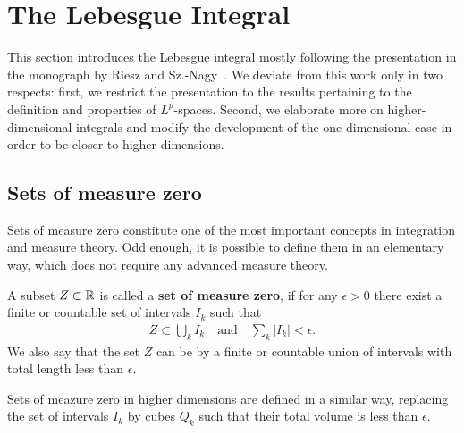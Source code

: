 
\section{The Lebesgue Integral}
\label{sec:lebesgue-integral}
\begin{intro}
  This section introduces the Lebesgue integral mostly following the
  presentation in the monograph by Riesz and
  Sz.-Nagy~\cite{RieszNagy}. We deviate from this work only in two
  respects: first, we restrict the presentation to the results
  pertaining to the definition and properties of $L^p$-spaces. Second,
  we elaborate more on higher-dimensional integrals and modify the
  development of the one-dimensional case in order to be closer to
  higher dimensions.
\end{intro}

\subsection{Sets of measure zero}

\begin{intro}
  Sets of measure zero constitute one of the most important concepts
  in integration and measure theory. Odd enough, it is possible to
  define them in an elementary way, which does not require any
  advanced measure theory.
\end{intro}

\begin{definition}
  \label{def:zero-set-1}
  A subset $Z\subset \mathbb R$ is called a \textbf{set of measure zero}, if
  for any $\epsilon > 0$ there exist a finite or countable set of
  intervals $I_{k}$ such that
  \begin{gather*}
    Z \subset \bigcup_k I_{k}
    \quad\text{and}\quad
    \sum_k |I_{k}| < \epsilon.
  \end{gather*}
  We also say that the set $Z$ can be  by a finite or
  countable union of intervals with total length less than $\epsilon$.
\end{definition}

\begin{definition}
  \label{def:zero-set-2}
  Sets of meazure zero in higher dimensions are defined in a similar
  way, replacing the set of intervals $I_k$ by cubes $Q_k$ such that
  their total volume is less than $\epsilon$.
\end{definition}

